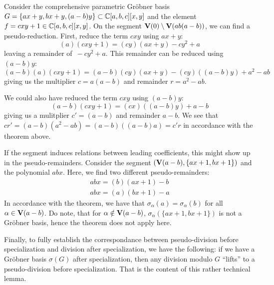\begin{example}\upshape
  Consider the comprehensive parametric Gröbner basis $G = \{ ax + y, bx + y, (a - b)y \} \subset \mathbb{C}[a, b, c][x, y]$ and the element $f = cxy + 1 \in \mathbb{C}[a, b, c][x, y]$. On the segment $\operatorname{\mathbf V}(0) \setminus \operatorname{\mathbf V}(ab(a-b))$, we can find a pseudo-reduction. First, reduce the term $cxy$ using $ax + y$:
  \[ (a)(cxy + 1) = (cy)(ax + y) - cy^{2} + a \]
  leaving a remainder of $\,-cy^{2} + a$. This remainder can be reduced using $(a - b)y$:
  \[(a-b)(a)(cxy + 1) = (a-b)(cy)(ax + y) - (cy)((a - b)y) + a^{2} - ab \]
  giving us the multiplier $c = a(a - b)$ and remainder $r = a^{2} - ab$.

  We could also have reduced the term $cxy$ using $(a - b)y$:
  \[(a-b)(cxy + 1) = (cx)((a-b)y) + a - b \]
  giving us a mulitplier $c' = (a - b)$ and remainder $a - b$. We see that $c r' = (a-b)(a^{2} - ab) = (a - b)((a-b)a) = c' r$ in accordance with the theorem above.

  If the segment induces relations between leading coefficients, this might show up in the pseudo-remainders. Consider the segment $(\operatorname{\mathbf V}(a - b), \{ax + 1, bx + 1\})$ and the polynomial $abx$. Here, we find two different pseudo-remainders:
  \begin{align*}
    abx = (b)(ax + 1) - b \\
    abx = (a)(bx + 1) - a
  \end{align*}
  In accordance with the theorem, we have that $\sigma_{\alpha}(a) = \sigma_{\alpha}(b)$ for all $\alpha \in \operatorname{\mathbf V}(a - b)$. Do note, that for $\alpha \notin \operatorname{\mathbf V}(a - b)$, $\sigma_{\alpha}(\{ax + 1, bx + 1\})$ is not a Gröbner basis, hence the theorem does not apply here.
\end{example}

Finally, to fully establish the correspondance between pseudo-division before specialization and division after specialization, we have the following: if we have a Gröbner basis $\sigma(G)$ after specialization, then any division modulo $G$ ``lifts'' to a pseudo-division before specialization. That is the content of this rather technical lemma.

